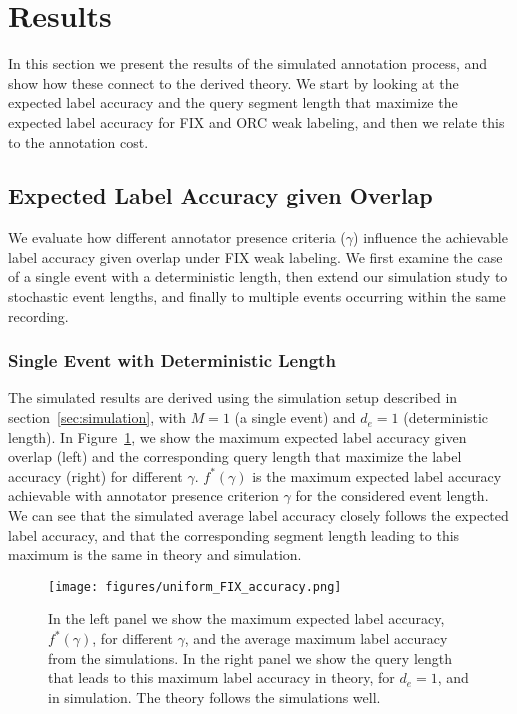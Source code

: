 \section{Results}
\label{sec:results}
In this section we present the results of the simulated annotation process, and show how these connect to the derived theory. We start by looking at the expected label accuracy and the query segment length that maximize the expected label accuracy for FIX and ORC weak labeling, and then we relate this to the annotation cost.

\subsection{Expected Label Accuracy given Overlap}

We evaluate how different annotator presence criteria ($\gamma$) influence the achievable label accuracy given overlap under FIX weak labeling. We first examine the case of a single event with a deterministic length, then extend our simulation study to stochastic event lengths, and finally to multiple events occurring within the same recording.


\subsubsection{Single Event with Deterministic Length}
The simulated results are derived using the simulation setup described in section~\ref{sec:simulation}, with $M=1$ (a single event) and $d_e=1$ (deterministic length). In Figure~\ref{fig:simple_simulation}, we show the maximum expected label accuracy given overlap (left) and the corresponding query length that maximize the label accuracy (right) for different $\gamma$. $f^*(\gamma)$ is the maximum expected label accuracy achievable with annotator presence criterion $\gamma$ for the considered event length. We can see that the simulated average label accuracy closely follows the expected label accuracy, and that the corresponding segment length leading to this maximum is the same in theory and simulation.

\begin{figure}[H]
    \centering
    \texttt{[image: figures/uniform\_FIX\_accuracy.png]}
    \caption{In the left panel we show the maximum expected label accuracy, $f^*(\gamma)$, for different $\gamma$, and the average maximum label accuracy from the simulations. In the right panel we show the query length that leads to this maximum label accuracy in theory, for $d_e = 1$, and in simulation. The theory follows the simulations well.}
    \label{fig:simple_simulation}
\end{figure}


